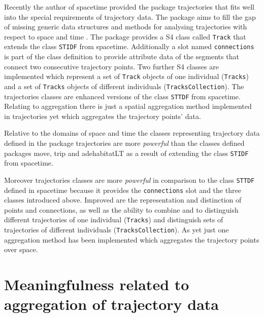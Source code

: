 \documentclass[12pt, oneside, a4paper]{scrbook}
\newcommand{\pkg}[1]{{\normalfont\fontseries{b}\selectfont #1}}
\let\code=\texttt
\begin{document}
Recently the author of \pkg{spacetime} provided the package \pkg{trajectories} \citep{pebesma_trajectories:_2014} that fits well into the special requirements of trajectory data. The package aims to fill the gap of missing generic data structures and methods for analysing trajectories with respect to space and time \citep{klus_analysing_2014}. The package provides a S4 class called \code{Track} that extends the class \code{STIDF} from \pkg{spacetime}. Additionally a slot named \code{connections} is part of the class definition to provide attribute data of the segments that connect two consecutive trajectory points. Two further S4 classes are implemented which represent a set of \code{Track} objects of one individual (\code{Tracks}) and a set of \code{Tracks} objects of different individuals (\code{TracksCollection}). The \pkg{trajectories} classes are enhanced versions of the class \code{STTDF} from \pkg{spacetime}.
Relating to aggregation there is just a spatial aggregation method implemented in \pkg{trajectories} yet which aggregates the trajectory points' data.
\par\medskip

Relative to the domains of space and time the classes representing trajectory data defined in the package \pkg{trajectories} are more \textit{powerful} than the classes defined packages \pkg{move}, \pkg{trip} and \pkg{adehabitatLT} as a result of extending the class \code{STIDF} from \pkg{spacetime}.
\par\medskip

Moreover \pkg{trajectories} classes are more \textit{powerful} in comparison to the class \code{STTDF} defined in \pkg{spacetime} because it provides the \code{connections} slot and the three classes introduced above. Improved are the representation and distinction of points and connections, as well as the ability to combine and to distinguish different trajectories of one individual (\code{Tracks}) and distinguish sets of trajectories of different individuals (\code{TracksCollection}). As yet just one aggregation method has been implemented which aggregates the trajectory points over space. 
\par\medskip



\chapter{Meaningfulness related to aggregation of trajectory data}
\label{chap:meaningful}
\end{document}
